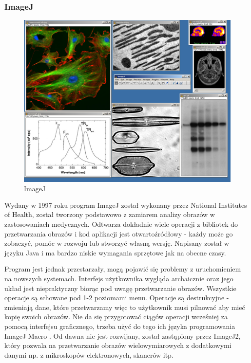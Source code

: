 \subsubsection{ImageJ}
\begin{figure}[H]
    \centering
    \includegraphics[width=0.8\linewidth]{./images/Picture3.png}
    \caption{ImageJ}
    \label{fig:imagej}
\end{figure}

Wydany w 1997 roku program ImageJ został wykonany przez National Institutes of Health, został tworzony podstawowo z zamiarem analizy obrazów w zastosowaniach medycznych. 
Odtwarza dokładnie wiele operacji z bibliotek do przetwarzania obrazów i kod aplikacji jest otwartoźródłowy - każdy może go zobaczyć, pomóc w rozwoju lub stworzyć własną wersję. 
Napisany został w języku Java i ma bardzo niskie wymagania sprzętowe jak na obecne czasy.

Program jest jednak przestarzały, mogą pojawić się problemy z uruchomieniem na nowszych systemach. Interfejs użytkownika wygląda archaicznie oraz jego układ jest niepraktyczny biorąc pod uwagę przetwarzanie obrazów. 
Wszystkie operacje są schowane pod 1-2 poziomami menu. 
Operacje są destrukcyjne - zmieniają dane, które przetwarzamy więc to użytkownik musi pilnować aby mieć kopię swoich obrazów. 
Nie da się przygotować ciągów operacji wcześniej za pomocą interfejsu graficznego, trzeba użyć do tego ich języka programowania ImageJ Macro \cite{imagejbatch}. 
Od dawna nie jest rozwijany, został zastąpiony przez ImageJ2, który pozwala na przetwarzanie obrazów wielowymiarowych z dodatkowymi danymi np. z mikroskopów elektronowych, skanerów itp.

